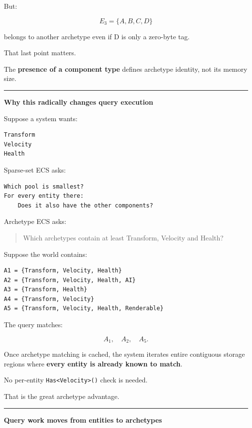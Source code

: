 But:

\[
E_3=\{A,B,C,D\}
\]

belongs to another archetype even if D is only a zero-byte tag.

That last point matters.

The \textbf{presence of a component type} defines archetype identity, not its memory size.

\begin{center}\rule{0.5\linewidth}{0.5pt}\end{center}

\textbf{Why this radically changes query execution}

Suppose a system wants:

\begin{verbatim}
Transform
Velocity
Health
\end{verbatim}

Sparse-set ECS asks:

\begin{verbatim}
Which pool is smallest?
For every entity there:
    Does it also have the other components?
\end{verbatim}

Archetype ECS asks:

\begin{quote}
Which archetypes contain at least Transform, Velocity and Health?
\end{quote}

Suppose the world contains:

\begin{verbatim}
A1 = {Transform, Velocity, Health}
A2 = {Transform, Velocity, Health, AI}
A3 = {Transform, Health}
A4 = {Transform, Velocity}
A5 = {Transform, Velocity, Health, Renderable}
\end{verbatim}

The query matches:

\[
A_1,\quad A_2,\quad A_5.
\]

Once archetype matching is cached, the system iterates entire contiguous storage regions where \textbf{every entity is already known to match}.

No per-entity \texttt{Has\textless{}Velocity\textgreater{}()} check is needed.

That is the great archetype advantage.

\begin{center}\rule{0.5\linewidth}{0.5pt}\end{center}

\textbf{Query work moves from entities to archetypes}

